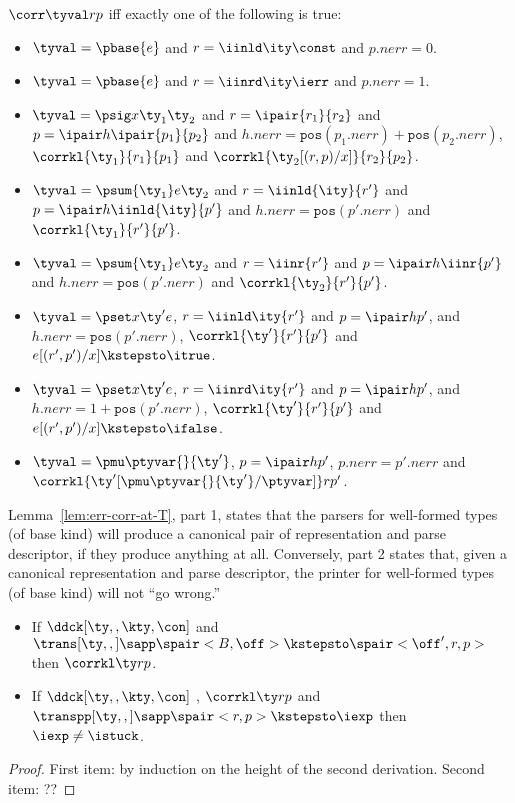 \begin{definition}
$\corr \tyval r p$ iff exactly one of the following is true:
  \begin{itemize}
  \item $\tyval = \pbase{e}$ and $r = \iinld \ity \const$ and $p.{nerr} = 0$.
  \item $\tyval = \pbase{e}$ and $r = \iinrd \ity \ierr$ and $p.{nerr} = 1$.
  \item $\tyval = \psig x {\ty_1} {\ty_2}$ and $r =\ipair {r_1} {r_2}$ and $p =
    \ipair h {\ipair {p_1} {p_2}}$ 
    and $h.{nerr} = \mathtt{pos}(p_1.{nerr}) + \mathtt{pos}(p_2.{nerr})$, $\corrkl
    {\ty_1} {r_1} {p_1}$ and $\corrkl {\ty_2[(r,p)/x]} {r_2} {p_2}$.
  \item $\tyval = \psum {\ty_1} e {\ty_2}$ and $r =\iinld {\ity}{r'}$
    and $p = \ipair h {\iinld {\ity}{p'}}$
    and $h.{nerr} = \mathtt{pos}(p'.{nerr})$ and $\corrkl
    {\ty_1} {r'} {p'}$.
  \item $\tyval = \psum {\ty_1} e {\ty_2}$ and $r =\iinr {r'}$
    and $p = \ipair h {\iinr {p'}}$
    and $h.{nerr} = \mathtt{pos}(p'.{nerr})$ and $\corrkl
    {\ty_2} {r'} {p'}$.
  \item $\tyval = \pset x {\ty'} e$, $r = \iinld \ity {r'}$ and $p =
    \ipair h {p'}$, 
    and $h.{nerr} = \mathtt{pos}(p'.{nerr})$, $\corrkl {\ty'}{r'}{p'}$
    and $e[(r',p')/x] \kstepsto\itrue$.
  \item $\tyval = \pset x {\ty'} e$, $r = \iinrd \ity {r'}$
    and $p = \ipair h {p'}$,
    and $h.{nerr} = 1 + \mathtt{pos}(p'.{nerr})$,
    $\corrkl {\ty'}{r'}{p'}$ and $e[(r',p')/x] \kstepsto \ifalse$.
  \item $\tyval = \pmu \ptyvar {} {\ty'}$, $p =
    \ipair h {p'}$, $p.{nerr} = p'.{nerr}$ and
    $\corrkl {\ty'[\pmu \ptyvar {} {\ty'}/\ptyvar]} r {p'}$.
  \end{itemize}
\end{definition}

Lemma~\ref{lem:err-corr-at-T}, part 1, states that the parsers for
well-formed types (of base kind) will produce a canonical pair of
representation and parse descriptor, if they produce anything at all.
Conversely, part 2 states that, given a canonical representation and
parse descriptor, the printer for well-formed types (of base kind)
will not ``go wrong.''

\begin{lemma}
\label{lem:err-corr-at-T}
\begin{itemize}
\item If $\ddck[\ty,,\kty,\con]$ and $\trans[\ty,,] \sapp \spair<B,\off> \kstepsto
  \spair<\off',r,p>$ then $\corrkl \ty r p$.
\item If $\ddck[\ty,,\kty,\con]$ , $\corrkl \ty r p$ and
  $\transpp[\ty,,] \sapp \spair<r,p> \kstepsto \iexp$ then $\iexp \neq
  \istuck$.
\end{itemize}
\end{lemma}

\begin{proof}
  First item: by induction on the height of the second derivation.
  Second item: ??
\end{proof}



